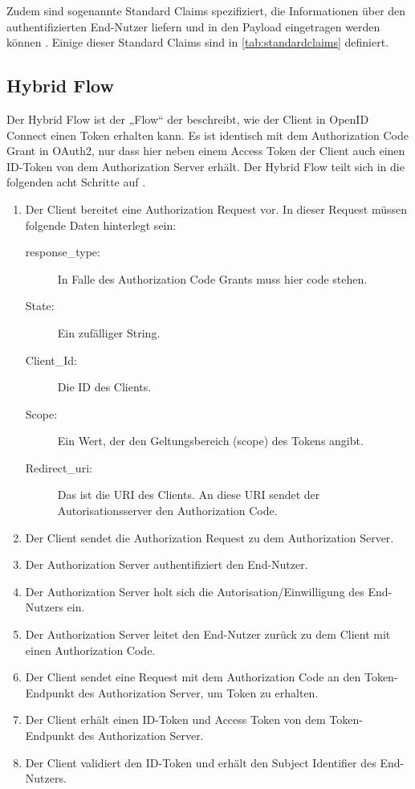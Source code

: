 Zudem sind sogenannte Standard Claims spezifiziert, die Informationen über den 
authentifizierten End-Nutzer liefern und in den Payload eingetragen werden können \citep{openidconnect:2014}.  
Einige dieser Standard Claims sind in \autoref{tab:standardclaims} definiert. 

\subsection{Hybrid Flow}
\label{subsec:OpenIDConnect:HybridFlow}
Der Hybrid Flow ist der „Flow“ der beschreibt, wie der Client in OpenID Connect einen
Token erhalten kann. Es ist identisch mit dem Authorization Code Grant in OAuth2, nur 
dass hier neben einem Access Token der Client auch einen ID-Token von dem Authorization 
Server erhält. Der Hybrid Flow teilt sich in die folgenden acht Schritte auf \citep{openidconnect:2014}.

\begin{enumerate}
  \item Der Client bereitet eine Authorization Request vor. In dieser Request müssen folgende Daten hinterlegt sein:
    \begin{description}
      \item[response\_type:] In Falle des Authorization Code Grants muss hier code stehen. 
      \item[State:] Ein zufälliger String. 
      \item[Client\_Id:] Die ID des Clients. 
      \item[Scope:] Ein Wert, der den Geltungsbereich (scope) des Tokens angibt. 
      \item[Redirect\_uri:] Das ist die URI des Clients. An diese URI sendet der Autorisationsserver den Authorization Code. 
    \end{description}
  \item Der Client sendet die Authorization Request zu dem Authorization Server.
  \item Der Authorization Server authentifiziert den End-Nutzer. 
  \item Der Authorization Server holt sich die Autorisation/Einwilligung des End-Nutzers ein. 
  \item Der Authorization Server leitet den End-Nutzer zurück zu dem Client mit 
  einen Authorization Code.
  \item Der Client sendet eine Request mit dem Authorization Code an den Token-Endpunkt des Authorization Server, um Token zu erhalten. 
  \item Der Client erhält einen ID-Token und Access Token von dem Token-Endpunkt des Authorization Server.
  \item Der Client validiert den ID-Token und erhält den Subject Identifier des End-Nutzers.    
\end{enumerate}

